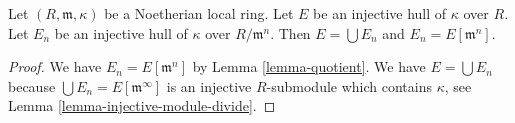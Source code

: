 \begin{lemma}
\label{lemma-union-artinian}
Let $(R, \mathfrak m, \kappa)$ be a Noetherian local ring.
Let $E$ be an injective hull of $\kappa$ over $R$.
Let $E_n$ be an injective hull of $\kappa$ over $R/\mathfrak m^n$.
Then $E = \bigcup E_n$ and $E_n = E[\mathfrak m^n]$.
\end{lemma}

\begin{proof}
We have $E_n = E[\mathfrak m^n]$ by Lemma \ref{lemma-quotient}.
We have $E = \bigcup E_n$ because $\bigcup E_n = E[\mathfrak m^\infty]$
is an injective $R$-submodule which contains $\kappa$, see
Lemma \ref{lemma-injective-module-divide}.
\end{proof}
